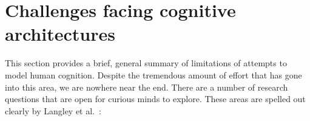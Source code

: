 

\section{Challenges facing cognitive architectures}

This section provides a brief, general summary of limitations
of attempts to model human cognition.
%
%
Despite the tremendous amount of effort that has gone into this area, we
are nowhere near the end. There are a number of research questions
that are open for curious minds to explore. These areas are spelled
out clearly by Langley et al.~\cite{citeulike:4182324}:


